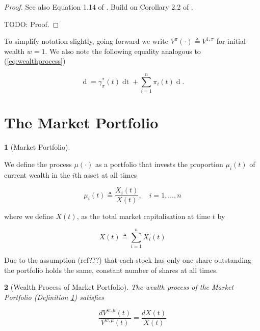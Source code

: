 \documentclass[british]{amsart}
\numberwithin{equation}{section}
\numberwithin{figure}{section}
\theoremstyle{plain}
\newtheorem{thm}{\protect\theoremname}[section]
\theoremstyle{definition}
\newtheorem{defn}[thm]{\protect\definitionname}
\theoremstyle{plain}
\theoremstyle{plain}
\theoremstyle{plain}
\theoremstyle{remark}
\theoremstyle{plain}
\providecommand{\definitionname}{Definition}
\providecommand{\theoremname}{Theorem}
\renewcommand{\d}[1]{\mathop{\mathrm{d}{#1}}}
\newcommand{\defeq}{\mathop{\triangleq}}
\newcommand{\rangei}{i=1,\dots,n}
\begin{document}
\begin{proof}
	See also Equation 1.14 of \cite{fernholz2009}.
	Build on Corollary 2.2 of \cite{fernholz1999pgf}.

	TODO: Proof.
\end{proof}

To simplify notation slightly, going forward we write $V^{\pi}(\cdot) \defeq V^{1,\pi}$ for initial wealth $w=1$. We also note the following equality analogous to (\ref{eq:wealthprocess})

\begin{equation}
	\label{eq:logvalueprocess}
		\d{\log V^{\pi}(t)} = \gamma_{\pi}^{*}(t)\d{t} + \sum_{i=1}^{n} \pi_{i}(t) \d{\log{X_{i}(t)}}.
\end{equation}

\newpage

\section{The Market Portfolio}

\begin{defn} [Market Portfolio]
	\label{def:marketportfolio}

	We define the process $\mu(\cdot)$ as a portfolio that invests the proportion
	$\mu_{i}(t)$ of current wealth in the $i$th asset at all times

	\begin{equation}
		\label{eq:marketportfolio}
		\mu_{i}(t) \defeq \frac{X_{i}(t)}{X(t)},
		\quad \rangei	
	\end{equation}

	where we define $X(t)$, as the total market capitalisation at time $t$ by

	\begin{equation}
		\label{eq:totalmarketcapitalisation}
		X(t) \defeq \sum_{i=1}^{n} X_{i}(t)	
	\end{equation}

  Due to the	assumption (ref???) that each stock has only one share outstanding the portfolio
	holds the same, constant number of shares at all times.

\end{defn}

\begin{thm} [Wealth Process of Market Portfolio]

	The wealth process of the Market Portfolio (Definition \ref{def:marketportfolio}) satisfies

	\begin{equation}
		\label{eq:wealthprocessofmarketportfolio}
			\frac{d{V^{w,\mu}(t)}}{V^{w,\mu}(t)} = \frac{d{X(t)}}{X(t)}  
	\end{equation}

\end{thm}
\end{document}
